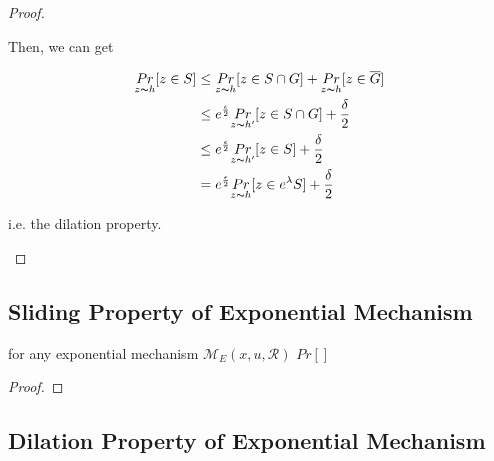 \documentclass{article}
\begin{document}
\begin{proof}
\begin{itemize}
	Then, we can get

	\begin{equation*}
	\begin{split}
	\underset{z \thicksim h}{Pr}[z \in S] 
	& \leq \underset{z \thicksim h}{Pr}[z \in S\cap G] + \underset{z \thicksim h}{Pr}[z \in \overline{G}]\\
	& \leq e^{\frac{\epsilon}{2}} \underset{z \thicksim h'}{Pr}[z \in S \cap G] + \frac{\delta}{2}\\ 
	& \leq e^{\frac{\epsilon}{2}} \underset{z \thicksim h'}{Pr}[z \in S] + \frac{\delta}{2}\\ 
	& = e^{\frac{\epsilon}{2}} \underset{z \thicksim h}{Pr}[z \in e^{\lambda} S] + \frac{\delta}{2}\\ 
	\end{split}
	\end{equation*}	

	i.e. the dilation property.

\end{itemize}

\end{proof}

\subsection{Sliding Property of Exponential Mechanism}
\begin{lem}
for any exponential mechanism $\mathcal{M}_E(x, u, \mathcal{R})$ $Pr[]$
\end{lem}
\begin{proof}
\end{proof}

\subsection{Dilation Property of Exponential Mechanism}





\end{document}
